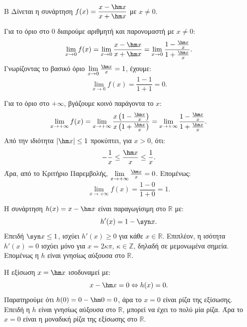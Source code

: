 \begin{thema}{Β}
Δίνεται η συνάρτηση $f(x) = \dfrac{x - \hm x}{x + \hm x}$ με $x\ne0$.
\begin{erwthma}
\item Για το όριο στο 0 διαιρούμε αριθμητή και παρονομαστή με $x \neq 0$:
\[ \lim_{x\to0} f(x) = \lim_{x\to0} \frac{x - \hm x}{x + \hm x} = \lim_{x\to0} \frac{1 - \frac{\hm x}{x}}{1 + \frac{\hm x}{x}}. \]
Γνωρίζοντας το βασικό όριο $\lim\limits_{x\to0} \frac{\hm x}{x} = 1$, έχουμε:
\[ \lim_{x\to0} f(x) = \frac{1 - 1}{1 + 1} = 0. \]

\item Για το όριο στο $+\infty$, βγάζουμε κοινό παράγοντα το $x$:
\[ \lim_{x\to+\infty} f(x) = \lim_{x\to+\infty} \frac{x\left(1 - \frac{\hm x}{x}\right)}{x\left(1 + \frac{\hm x}{x}\right)}
= \lim_{x\to+\infty} \frac{1 - \frac{\hm x}{x}}{1 + \frac{\hm x}{x}}. \]
Από την ιδιότητα $|\hm x| \le 1$ προκύπτει, για $x>0$, ότι:
\[ -\frac{1}{x} \le \frac{\hm x}{x} \le \frac{1}{x}. \]
Άρα, από το Κριτήριο Παρεμβολής, $\lim\limits_{x\to+\infty} \frac{\hm x}{x}=0$.
Επομένως:
\[ \lim_{x\to+\infty} f(x) = \frac{1 - 0}{1 + 0} = 1. \]

\item Η συνάρτηση $h(x) = x - \hm x$ είναι παραγωγίσιμη στο $\mathbb{R}$ με:
\[ h'(x) = 1 - \syn x. \]
Επειδή $\syn x \le 1$, ισχύει $h'(x)\ge0$ για κάθε $x\in\mathbb{R}$.
Επιπλέον, η ισότητα $h'(x)=0$ ισχύει μόνο για $x=2\kappa\pi$, $\kappa\in\mathbb{Z}$, δηλαδή σε μεμονωμένα σημεία. Επομένως η $h$ είναι γνησίως αύξουσα στο $\mathbb{R}$.

\item Η εξίσωση $x=\hm x$ ισοδυναμεί με:
\[ x-\hm x=0 \Leftrightarrow h(x)=0. \]
Παρατηρούμε ότι $h(0)=0-\hm0=0$, άρα το $x=0$ είναι ρίζα της εξίσωσης.
Επειδή η $h$ είναι γνησίως αύξουσα στο $\mathbb{R}$, μπορεί να έχει το πολύ μία ρίζα. Άρα το $x=0$ είναι η μοναδική ρίζα της εξίσωσης στο $\mathbb{R}$.
\end{erwthma}
\end{thema}

